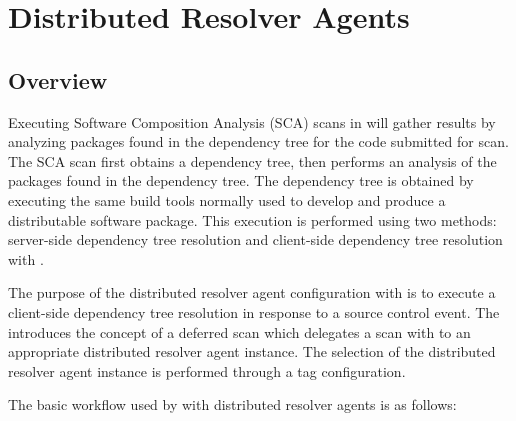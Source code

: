 \chapter{Distributed Resolver Agents}\label{sec:resolver-agents}

\section{Overview}

Executing Software Composition Analysis (SCA) scans in \cxone will gather results
by analyzing packages found in the dependency tree for the code submitted for scan.  
The \cxone SCA scan first obtains a dependency tree, then performs an analysis
of the packages found in the dependency tree. The dependency
tree is obtained by executing the same build tools normally used to develop and produce a
distributable software package.  This execution is performed using two methods: server-side 
dependency tree resolution and client-side dependency tree resolution with \scaresolver.

The purpose of the distributed resolver agent configuration with \cxoneflow is to execute a
client-side dependency tree resolution in response to a source control event.  The \cxone
{} introduces the concept of a deferred scan which delegates
a scan with \scaresolver to an appropriate distributed resolver agent instance.  The selection of
the distributed resolver agent instance is performed through a tag configuration.

The basic workflow used by \cxoneflow with distributed resolver agents is as follows:

